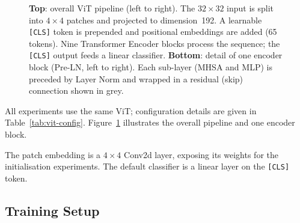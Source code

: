 \documentclass[10pt,twocolumn]{article}
\begin{document}
\begin{figure}[t]
    \caption{\textbf{Top}: overall ViT pipeline (left to right).
        The $32{\times}32$ input is split into $4{\times}4$ patches and projected to
        dimension~192.  A learnable \texttt{[CLS]} token is prepended and positional
        embeddings are added (65 tokens).  Nine Transformer Encoder blocks process
        the sequence; the \texttt{[CLS]} output feeds a linear classifier.
        \textbf{Bottom}: detail of one encoder block (Pre-LN, left to right).
        Each sub-layer (MHSA and MLP) is preceded by Layer Norm and wrapped in a
        residual (skip) connection shown in grey.}
    \label{fig:architecture}
\end{figure}

All experiments use the same ViT; configuration details are given in Table~\ref{tab:vit-config}. Figure~\ref{fig:architecture} illustrates the overall pipeline and one encoder block.

The patch embedding is a $4\times4$ Conv2d layer, exposing its weights for the
initialisation experiments. The default classifier is a linear layer on the \texttt{[CLS]} token.

\subsection{Training Setup}\label{sec:training}
\end{document}
